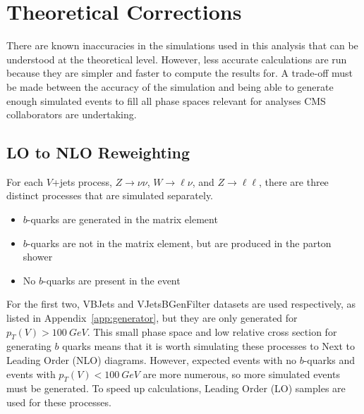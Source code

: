 \section{Theoretical Corrections}

There are known inaccuracies in the simulations used in this analysis
that can be understood at the theoretical level.
However, less accurate calculations are run because they are simpler
and faster to compute the results for.
A trade-off must be made between the accuracy of the simulation
and being able to generate enough simulated events to fill all phase spaces
relevant for analyses CMS collaborators are undertaking.

\subsection{LO to NLO Reweighting}

For each $V$+jets process, $Z\rightarrow\nu\nu$, $W\rightarrow\ell\nu$,
and $Z\rightarrow\ell\ell$, there are three distinct processes that are simulated separately.
\begin{itemize}
\item $b$-quarks are generated in the matrix element
\item $b$-quarks are not in the matrix element, but are produced in the parton shower
\item No $b$-quarks are present in the event
\end{itemize}
For the first two, VBJets and VJetsBGenFilter datasets are used respectively,
as listed in Appendix~\ref{app:generator},
but they are only generated for $p_T(V) > \SI{100}{GeV}$.
This small phase space and low relative cross section for generating $b$ quarks
means that it is worth simulating these processes to Next to Leading Order (NLO) diagrams.
However, expected events with no $b$-quarks and events with $p_T(V) < \SI{100}{GeV}$
are more numerous, so more simulated events must be generated.
To speed up calculations, Leading Order (LO) samples are used for these processes.

